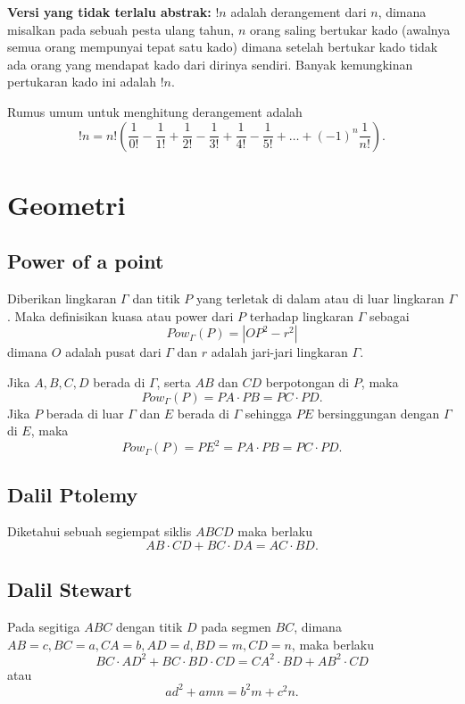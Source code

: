     \textbf{Versi yang tidak terlalu abstrak:} $!n$ adalah derangement dari $n$, dimana misalkan pada sebuah pesta ulang tahun, $n$ orang saling bertukar kado (awalnya semua orang mempunyai tepat satu kado) dimana setelah bertukar kado tidak ada orang yang mendapat kado dari dirinya sendiri. Banyak kemungkinan pertukaran kado ini adalah $!n$.
    
    Rumus umum untuk menghitung derangement adalah
    $$!n = n! \left(\dfrac{1}{0!}-\dfrac{1}{1!}+\dfrac{1}{2!}-\dfrac{1}{3!}+\dfrac{1}{4!}-\dfrac{1}{5!}+\dots+(-1)^n\dfrac{1}{n!}\right).$$
    
    
    
    \section{Geometri}
    
    \subsection{Power of a point}
    Diberikan lingkaran $\Gamma$ dan titik $P$ yang terletak di dalam atau di luar lingkaran $\Gamma$. Maka definisikan kuasa atau power dari $P$ terhadap lingkaran $\Gamma$ sebagai
    $$Pow_\Gamma (P) = |OP^2-r^2|$$
    dimana $O$ adalah pusat dari $\Gamma$ dan $r$ adalah jari-jari lingkaran $\Gamma$.
    
    Jika $A,B,C,D$ berada di $\Gamma$, serta $AB$ dan $CD$ berpotongan di $P$, maka $$Pow_\Gamma(P)=PA \cdot PB = PC \cdot PD.$$
    Jika $P$ berada di luar $\Gamma$ dan $E$ berada di $\Gamma$ sehingga $PE$ bersinggungan dengan $\Gamma$ di $E$, maka $$Pow_\Gamma (P) = PE^2 =  PA \cdot PB = PC \cdot PD.$$
    
    \subsection{Dalil Ptolemy}
        Diketahui sebuah segiempat siklis $ABCD$ maka berlaku
        $$AB \cdot CD + BC \cdot DA = AC \cdot BD.$$
        
    \subsection{Dalil Stewart}
        Pada segitiga $ABC$ dengan titik $D$ pada segmen $BC$, dimana $AB=c, BC=a, CA=b, AD=d, BD=m, CD=n$, maka berlaku
        $$BC \cdot AD^2 + BC \cdot BD \cdot CD = CA^2 \cdot BD + AB^2 \cdot CD$$
        atau $$ad^2+amn = b^2m+c^2n.$$
        
